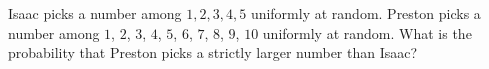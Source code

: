Isaac picks a number among $1, 2, 3, 4, 5$ uniformly at random. Preston picks a number among $1$, $2$, $3$, $4$, $5$, $6$, $7$, $8$, $9$, $10$ uniformly at random. What is the probability that Preston picks a strictly larger number than Isaac?
